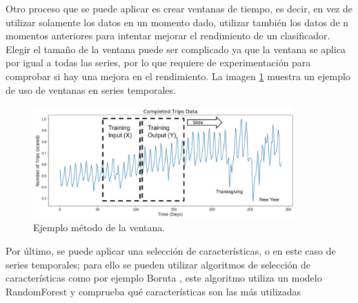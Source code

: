 Otro proceso que se puede aplicar es crear ventanas de tiempo, es decir, en vez de utilizar solamente los datos en un momento dado, utilizar también los datos de n momentos anteriores para intentar mejorar el rendimiento de un clasificador. Elegir el tamaño de la ventana puede ser complicado ya que la ventana se aplica por igual a todas las series, por lo que requiere de experimentación para comprobar si hay una mejora en el rendimiento. La imagen \ref{fig:52} muestra un ejemplo de uso de ventanas en series temporales.\newline


\begin{figure}[h]
	\centering
	\includegraphics[width=100mm]{imagenes/sliding_window_ts.png}
	\caption{Ejemplo método de la ventana.}
	\label{fig:52}
\end{figure}
\verticalspace

Por último, se puede aplicar una selección de características, o en este caso de series temporales; para ello se pueden utilizar algoritmos de selección de características como por ejemplo Boruta \cite{kursa2010boruta}, este algoritmo utiliza un modelo RandomForest y comprueba qué características son las más utilizadas 
